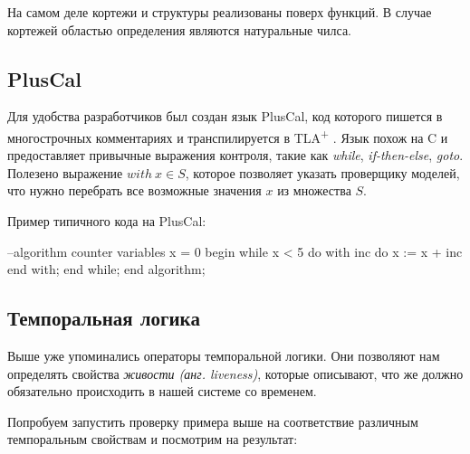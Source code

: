 \documentclass[14pt, openany]{report}
\newcommand{\tlapl}{TLA\textsuperscript{+} }
\begin{document}
На самом деле кортежи и структуры реализованы поверх функций. В случае кортежей областью определения являются натуральные чилса.

\subsection{PlusCal}
Для удобства разработчиков был создан язык PlusCal, код которого пишется в многострочных комментариях и транспилируется в \tlapl. Язык похож на C и предоставляет привычные выражения контроля, такие как \emph{while}, \emph{if-then-else}, \emph{goto}. Полезено выражение \(with~x \in S\), которое позволяет указать проверщику моделей, что нужно перебрать все возможные значения \(x\) из множества \(S\).

Пример типичного кода на PlusCal:
\begin{ppcal}
  --algorithm counter
  variables x = 0
  begin
    while x < 5 do
      with inc  do
        x := x + inc
      end with;
    end while;
  end algorithm; 
\end{ppcal}
\begin{tlatex}
%
%
%
%
%
%
%
%
%
\end{tlatex}

\subsection{Темпоральная логика}
Выше уже упоминались операторы темпоральной логики. Они позволяют нам определять свойства \emph{живости (анг. liveness)}, которые описывают, что же должно обязательно происходить в нашей системе со временем.

Попробуем запустить проверку примера выше на соответствие различным темпоральным свойствам и посмотрим на результат:
\end{document}
